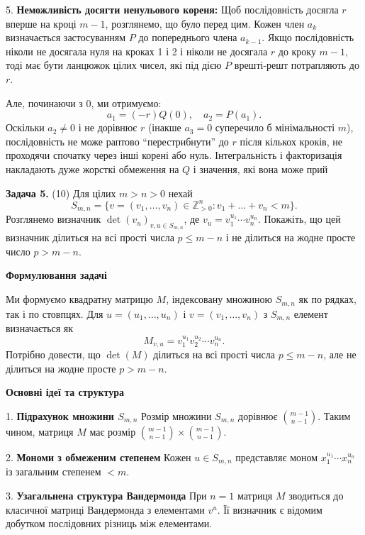 \documentclass{article}
\begin{document}
5. \textbf{Неможливість досягти ненульового кореня:}
   Щоб послідовність досягла \( r \) вперше на кроці \( m-1 \), розглянемо, що було перед цим. Кожен член \( a_k \) визначається застосуванням \( P \) до попереднього члена \( a_{k-1} \). Якщо послідовність ніколи не досягала нуля на кроках 1 і 2 і ніколи не досягала \( r \) до кроку \( m-1 \), тоді має бути ланцюжок цілих чисел, які під дією \( P \) врешті-решт потрапляють до \( r \).

   Але, починаючи з 0, ми отримуємо:
   \[
   a_1 = (-r)Q(0), \quad a_2 = P(a_1).
   \]
   Оскільки \( a_2 \neq 0 \) і не дорівнює \( r \) (інакше \( a_3 = 0 \) суперечило б мінімальності \( m \)), послідовність не може раптово “перестрибнути” до \( r \) після кількох кроків, не проходячи спочатку через інші корені або нуль. Інтегральність і факторизація накладають дуже жорсткі обмеження на \( Q \) і значення, які вона може прий



\bigskip

\noindent\textbf{Задача 5.} (10) Для цілих \( m > n > 0 \) нехай  
\[
S_{m,n} = \{ v = (v_1, \dots, v_n) \in \mathbb{Z}_{>0}^n : v_1 + \dots + v_n < m \}.
\]  
Розглянемо визначник \( \det(v_u)_{v,u \in S_{m,n}} \), де \( v_u = v_1^{u_1} \cdots v_n^{u_n} \). Покажіть, що цей визначник ділиться на всі прості числа \( p \leq m - n \) і не ділиться на жодне просте число \( p > m - n \).

\textbf{Формулювання задачі}

Ми формуємо квадратну матрицю \( M \), індексовану множиною \( S_{m,n} \) як по рядках, так і по стовпцях. Для \( u=(u_1,\dots,u_n)\) і \( v=(v_1,\dots,v_n) \) з \( S_{m,n} \) елемент визначається як  
\[
M_{v,u} = v_1^{u_1} v_2^{u_2} \cdots v_n^{u_n}.
\]  
Потрібно довести, що \(\det(M)\) ділиться на всі прості числа \( p \leq m - n \), але не ділиться на жодне просте \( p > m - n \).

\bigskip

\textbf{Основні ідеї та структура}

1. \textbf{Підрахунок множини \( S_{m,n} \)}  
   Розмір множини \( S_{m,n} \) дорівнює \(\binom{m-1}{n-1}\). Таким чином, матриця \( M \) має розмір \(\binom{m-1}{n-1} \times \binom{m-1}{n-1}\).

2. \textbf{Мономи з обмеженим степенем}  
   Кожен \( u \in S_{m,n} \) представляє моном \( x_1^{u_1}\cdots x_n^{u_n} \) із загальним степенем \( < m \).

3. \textbf{Узагальнена структура Вандермонда}  
   При \( n=1 \) матриця \( M \) зводиться до класичної матриці Вандермонда з елементами \( v^u \). Її визначник є відомим добутком послідовних різниць між елементами.
\end{document}
